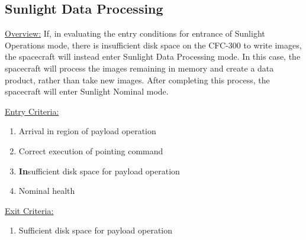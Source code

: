 \documentclass{article}
\begin{document}
\newpage

\subsection{Sunlight Data Processing}

\underline{Overview:} If, in evaluating the entry conditions for entrance of Sunlight Operations mode, there is insufficient disk space on the CFC-300 to write images, the spacecraft will instead enter Sunlight Data Processing mode. In this case, the spacecraft will process the images remaining in memory and create a data product, rather than take new images. After completing this process, the spacecraft will enter Sunlight Nominal mode.

\underline{Entry Criteria:} 

\begin{enumerate}
\item Arrival in region of payload operation
\item Correct execution of pointing command
\item \textbf{In}sufficient disk space for payload operation
\item Nominal health
\end{enumerate}

\underline{Exit Criteria:}

\begin{enumerate}
\item Sufficient disk space for payload operation
\end{enumerate}
\end{document}

